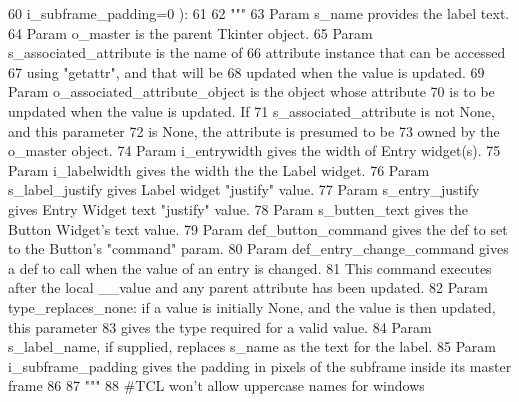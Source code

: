 \begin{DoxyCode}
60             i\_subframe\_padding=0 ):
61         
62         \textcolor{stringliteral}{"""}
63 \textcolor{stringliteral}{        Param s\_name provides the label text.}
64 \textcolor{stringliteral}{        Param o\_master is the parent Tkinter object.}
65 \textcolor{stringliteral}{        Param s\_associated\_attribute is the name of }
66 \textcolor{stringliteral}{            attribute instance that can be accessed}
67 \textcolor{stringliteral}{            using "getattr", and that will be}
68 \textcolor{stringliteral}{            updated when the value is updated.}
69 \textcolor{stringliteral}{        Param o\_associated\_attribute\_object is the object whose attribute}
70 \textcolor{stringliteral}{            is to be unpdated when the value is updated.  If}
71 \textcolor{stringliteral}{            s\_associated\_attribute is not None, and this parameter}
72 \textcolor{stringliteral}{            is None, the attribute is presumed to be}
73 \textcolor{stringliteral}{            owned by the o\_master object.}
74 \textcolor{stringliteral}{        Param i\_entrywidth gives the width of Entry widget(s).}
75 \textcolor{stringliteral}{        Param i\_labelwidth gives the width the the Label widget.}
76 \textcolor{stringliteral}{        Param s\_label\_justify gives Label widget "justify" value.}
77 \textcolor{stringliteral}{        Param s\_entry\_justify gives Entry Widget text "justify" value.}
78 \textcolor{stringliteral}{        Param s\_butten\_text gives the Button Widget's text value.}
79 \textcolor{stringliteral}{        Param def\_button\_command gives the def to set to the Button's "command" param.}
80 \textcolor{stringliteral}{        Param def\_entry\_change\_command gives a def to call when the value of an entry is changed.       }
81 \textcolor{stringliteral}{            This command executes after the local \_\_value and any parent attribute has been updated.}
82 \textcolor{stringliteral}{        Param type\_replaces\_none: if a value is initially None, and the value is then updated, this
       parameter}
83 \textcolor{stringliteral}{              gives the type required for a valid value.}
84 \textcolor{stringliteral}{        Param s\_label\_name, if supplied, replaces s\_name as the text for the label.}
85 \textcolor{stringliteral}{        Param i\_subframe\_padding gives the padding in pixels of the subframe inside its master frame}
86 \textcolor{stringliteral}{}
87 \textcolor{stringliteral}{        """}
88         \textcolor{comment}{#TCL won't allow uppercase names for windows}

\end{DoxyCode}
